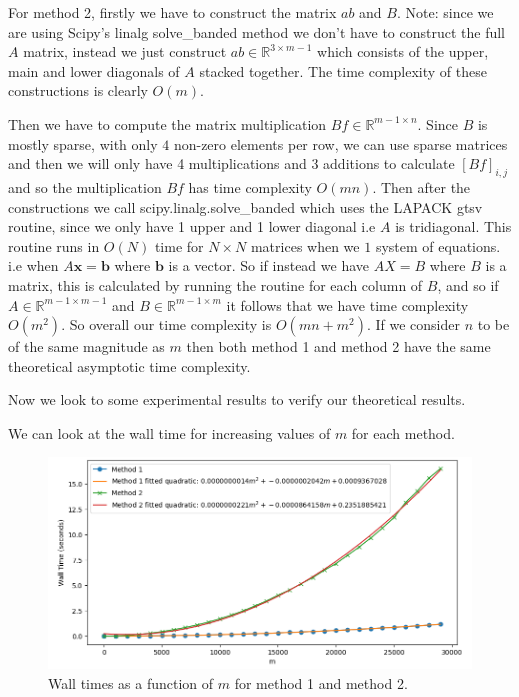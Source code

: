 \documentclass[a4paper, oneside]{book}
\begin{document}
For method 2, firstly we have to construct the matrix $ab$ and $B$. 
Note: since we are using Scipy's linalg solve\_banded method we don't have to 
construct the full $A$ matrix, instead we just construct $ab \in \mathbb{R}^{3 \times m-1}$ which consists
of the upper, main and lower diagonals of $A$ stacked together.
The time complexity of these constructions is clearly $O(m)$.

Then we have to compute the matrix multiplication $Bf \in \mathbb{R}^{m-1 \times n}$. Since $B$ is mostly sparse, with only $4$  non-zero elements per row, we can use sparse matrices and then we will only have 4 multiplications and 3 additions to calculate $[Bf]_{i,j}$ and so the multiplication $Bf$  has
time complexity $O(mn)$. Then after the constructions we call scipy.linalg.solve\_banded which uses the LAPACK gtsv routine, since we only have 1 upper and 1 lower diagonal i.e $A$ is tridiagonal.
This routine runs in $O(N)$ time for $N \times N$ matrices when we $1$ system of equations. i.e when $A \mathbf{x} = \mathbf{b}$ where $\mathbf{b}$ is a vector. So if instead we have $A X = B$ where $B$ is a matrix, this is calculated by running the routine for each column of $B$, and so if $A \in \mathbb{R}^{m-1 \times m-1}$ and $B \in \mathbb{R}^{m-1 \times m}$ it follows that we have time complexity $O(m^{2})$.
So overall our time complexity is $O(mn + m^{2})$. If we consider $n$ to be of the same magnitude as $m$ then both method 1 and method 2 have the same theoretical asymptotic time complexity.

Now we look to some experimental results to verify our theoretical results.

We can look at the wall time for increasing values of $m$ for each method.

\begin{figure}[htpb]
    \centering
    \includegraphics[width=1.0\textwidth]{./images/Screenshot_2023-12-08_13-34-06.png}
    \caption{Wall times as a function of $m$ for method 1 and method 2.}
\end{figure}
\end{document}
